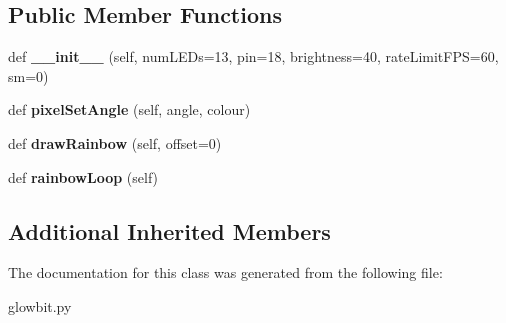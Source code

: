 \subsection*{Public Member Functions}
\begin{DoxyCompactItemize}
\item 
\mbox{\label{classglowbit_1_1rainbow_ab1af2d27c10f3ffba7b3ce955cb6229f}} 
def {\bfseries \+\_\+\+\_\+init\+\_\+\+\_\+} (self, num\+L\+E\+Ds=13, pin=18, brightness=40, rate\+Limit\+F\+PS=60, sm=0)
\item 
\mbox{\label{classglowbit_1_1rainbow_a0940825ae934617f95b96e472923f07a}} 
def {\bfseries pixel\+Set\+Angle} (self, angle, colour)
\item 
\mbox{\label{classglowbit_1_1rainbow_af03e480ce6a5d27780268b242a3fdfa7}} 
def {\bfseries draw\+Rainbow} (self, offset=0)
\item 
\mbox{\label{classglowbit_1_1rainbow_a0699f7cc630c57d49c78e93504d3c878}} 
def {\bfseries rainbow\+Loop} (self)
\end{DoxyCompactItemize}
\subsection*{Additional Inherited Members}


The documentation for this class was generated from the following file\+:\begin{DoxyCompactItemize}
\item 
glowbit.\+py\end{DoxyCompactItemize}

